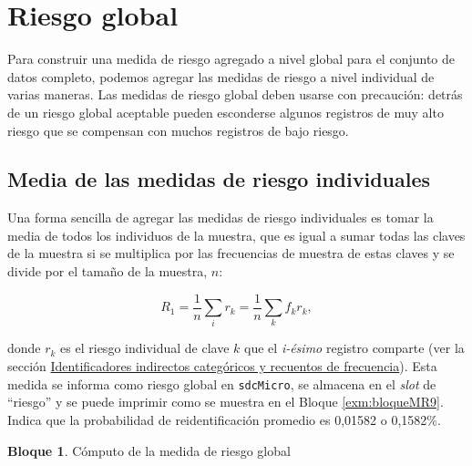 \documentclass[]{book}
\newenvironment{Shaded}{\begin{snugshade}}{\end{snugshade}}
\newcommand{\CommentTok}[1]{\textcolor[rgb]{0.56,0.35,0.01}{\textit{#1}}}
\newcommand{\NormalTok}[1]{#1}
\newcommand{\OperatorTok}[1]{\textcolor[rgb]{0.81,0.36,0.00}{\textbf{#1}}}
\theoremstyle{definition}
\theoremstyle{definition}
\newtheorem{example}{Bloque}[chapter]
\theoremstyle{definition}
\theoremstyle{definition}
\theoremstyle{remark}
\begin{document}
\hypertarget{riesgo-global}{%
\section{Riesgo global}\label{riesgo-global}}

Para construir una medida de riesgo agregado a nivel global para el conjunto de datos completo, podemos agregar las medidas de riesgo a nivel individual de varias maneras. Las medidas de riesgo global deben usarse con precaución: detrás de un riesgo global aceptable pueden esconderse algunos registros de muy alto riesgo que se compensan con muchos registros de bajo riesgo.

\hypertarget{media-de-las-medidas-de-riesgo-individuales}{%
\subsection{Media de las medidas de riesgo individuales}\label{media-de-las-medidas-de-riesgo-individuales}}

Una forma sencilla de agregar las medidas de riesgo individuales es tomar la media de todos los individuos de la muestra, que es igual a sumar todas las claves de la muestra si se multiplica por las frecuencias de muestra de estas claves y se divide por el tamaño de la muestra, \(n\):

\[R_{1}=\frac{1}{n}\sum_{i} r_{k}=\frac{1}{n}\sum_{k}f_{k}r_{k},\]

donde \(r_{k}\) es el riesgo individual de clave \(k\) que el \emph{i-ésimo} registro comparte (ver la sección \protect\hyperlink{identificadores-indirectos-categuxf3ricos-y-recuentos-de-frecuencia}{Identificadores indirectos categóricos y recuentos de frecuencia}). Esta medida se informa como riesgo global en \texttt{sdcMicro}, se almacena en el \emph{slot} de ``riesgo'' y se puede imprimir como se muestra en el Bloque \ref{exm:bloqueMR9}. Indica que la probabilidad de reidentificación promedio es 0,01582 o 0,1582\%.

\begin{example}
\protect\hypertarget{exm:bloqueMR9}{}{\label{exm:bloqueMR9} }Cómputo de la medida de riesgo global
\end{example}

\begin{Shaded}
\end{Shaded}
\end{document}

